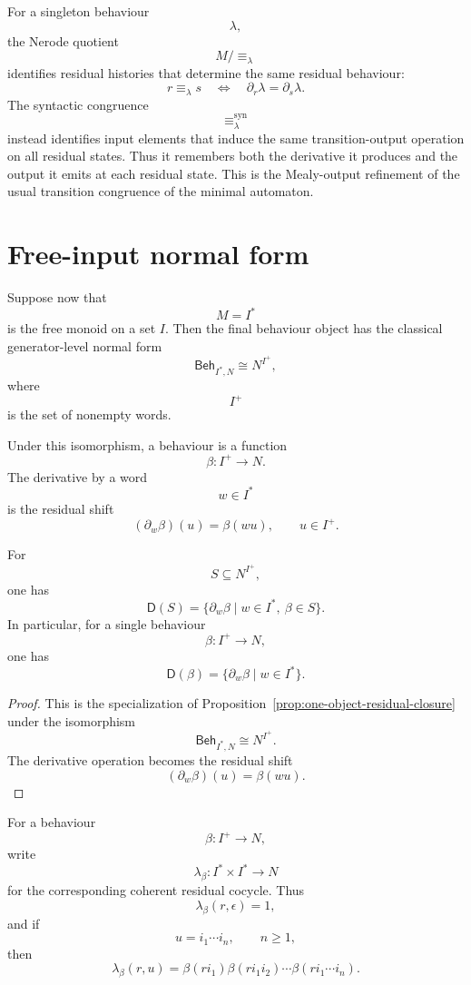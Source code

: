 \begin{remark}
\label{rem:state-nerode-versus-syntactic-congruence}
For a singleton behaviour
\[
\lambda,
\]
the Nerode quotient
\[
M/{\equiv_\lambda}
\]
identifies residual histories that determine the same residual behaviour:
\[
r\equiv_\lambda s
\quad\Longleftrightarrow\quad
\partial_r\lambda=\partial_s\lambda.
\]
The syntactic congruence
\[
{\equiv_\lambda^{\operatorname{syn}}}
\]
instead identifies input elements that induce the same transition-output
operation on all residual states. Thus it remembers both the derivative it
produces and the output it emits at each residual state. This is the
Mealy-output refinement of the usual transition congruence of the minimal
automaton.
\end{remark}

\section{Free-input normal form}
\label{sec:canonical-residual-closure-free-input}

Suppose now that
\[
M=I^\ast
\]
is the free monoid on a set \(I\). Then the final behaviour object has the
classical generator-level normal form
\[
\mathsf{Beh}_{I^\ast,N}
\cong
N^{I^+},
\]
where
\[
I^+
\]
is the set of nonempty words.

Under this isomorphism, a behaviour is a function
\[
\beta:I^+\to N.
\]
The derivative by a word
\[
w\in I^\ast
\]
is the residual shift
\[
(\partial_w\beta)(u)=\beta(wu),
\qquad
u\in I^+.
\]

\begin{proposition}
\label{prop:free-input-residual-closure}
For
\[
S\subseteq N^{I^+},
\]
one has
\[
\mathsf D(S)
=
\{\partial_w\beta\mid w\in I^\ast,\ \beta\in S\}.
\]
In particular, for a single behaviour
\[
\beta:I^+\to N,
\]
one has
\[
\mathsf D(\beta)
=
\{\partial_w\beta\mid w\in I^\ast\}.
\]
\end{proposition}

\begin{proof}
This is the specialization of
Proposition~\ref{prop:one-object-residual-closure} under the isomorphism
\[
\mathsf{Beh}_{I^\ast,N}\cong N^{I^+}.
\]
The derivative operation becomes the residual shift
\[
(\partial_w\beta)(u)=\beta(wu).
\]
\end{proof}

For a behaviour
\[
\beta:I^+\to N,
\]
write
\[
\lambda_\beta:I^\ast\times I^\ast\to N
\]
for the corresponding coherent residual cocycle. Thus
\[
\lambda_\beta(r,\epsilon)=1,
\]
and if
\[
u=i_1\cdots i_n,
\qquad n\geq 1,
\]
then
\[
\lambda_\beta(r,u)
=
\beta(ri_1)\beta(ri_1i_2)\cdots\beta(ri_1\cdots i_n).
\]

